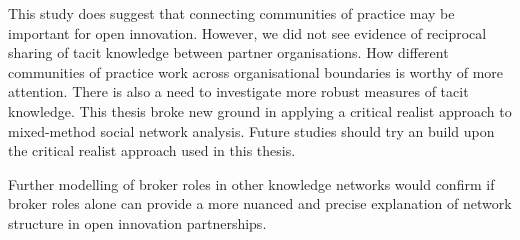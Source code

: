 This study does suggest that connecting communities of practice may be important for open innovation. However, we did not see evidence of reciprocal sharing of tacit knowledge between partner organisations. How different communities of practice work across organisational boundaries is worthy of more attention. There is also a need to investigate more robust measures of tacit knowledge. This thesis broke new  ground in applying a critical realist approach to mixed-method social network analysis. Future studies should try an build upon the critical realist approach used in this thesis. \medskip

Further modelling of broker roles in other knowledge networks would confirm if broker roles alone can provide a more nuanced and precise explanation of network structure in open innovation partnerships. 
